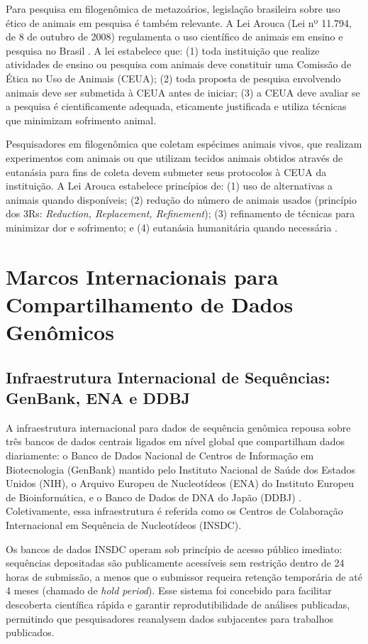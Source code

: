 Para pesquisa em filogenômica de metazoários, legislação brasileira sobre uso ético de animais em pesquisa é também relevante. A Lei Arouca (Lei nº 11.794, de 8 de outubro de 2008) regulamenta o uso científico de animais em ensino e pesquisa no Brasil \parencite{brasil2008arouca}. A lei estabelece que: (1) toda instituição que realize atividades de ensino ou pesquisa com animais deve constituir uma Comissão de Ética no Uso de Animais (CEUA); (2) toda proposta de pesquisa envolvendo animais deve ser submetida à CEUA antes de iniciar; (3) a CEUA deve avaliar se a pesquisa é cientificamente adequada, eticamente justificada e utiliza técnicas que minimizam sofrimento animal.

Pesquisadores em filogenômica que coletam espécimes animais vivos, que realizam experimentos com animais ou que utilizam tecidos animais obtidos através de eutanásia para fins de coleta devem submeter seus protocolos à CEUA da instituição. A Lei Arouca estabelece princípios de: (1) uso de alternativas a animais quando disponíveis; (2) redução do número de animais usados (princípio dos 3Rs: \textit{Reduction, Replacement, Refinement}); (3) refinamento de técnicas para minimizar dor e sofrimento; e (4) eutanásia humanitária quando necessária \parencite{brasil2008arouca}.

\section{Marcos Internacionais para Compartilhamento de Dados Genômicos}

\subsection{Infraestrutura Internacional de Sequências: GenBank, ENA e DDBJ}

A infraestrutura internacional para dados de sequência genômica repousa sobre três bancos de dados centrais ligados em nível global que compartilham dados diariamente: o Banco de Dados Nacional de Centros de Informação em Biotecnologia (GenBank) mantido pelo Instituto Nacional de Saúde dos Estados Unidos (NIH), o Arquivo Europeu de Nucleotídeos (ENA) do Instituto Europeu de Bioinformática, e o Banco de Dados de DNA do Japão (DDBJ) \parencite{genbank2023, ena2023, ddbj2023}. Coletivamente, essa infraestrutura é referida como os Centros de Colaboração Internacional em Sequência de Nucleotídeos (INSDC).

Os bancos de dados INSDC operam sob princípio de acesso público imediato: sequências depositadas são publicamente acessíveis sem restrição dentro de 24 horas de submissão, a menos que o submissor requeira retenção temporária de até 4 meses (chamado de \textit{hold period}). Esse sistema foi concebido para facilitar descoberta científica rápida e garantir reprodutibilidade de análises publicadas, permitindo que pesquisadores reanalysem dados subjacentes para trabalhos publicados.

